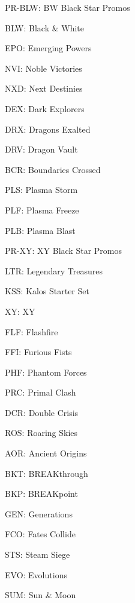 \documentclass[12pt,twocolumn]{article}
\begin{document}
PR-BLW: BW Black Star Promos

BLW: Black \& White

EPO: Emerging Powers

NVI: Noble Victories

NXD: Next Destinies

DEX: Dark Explorers

DRX: Dragons Exalted

DRV: Dragon Vault

BCR: Boundaries Crossed

PLS: Plasma Storm

PLF: Plasma Freeze

PLB: Plasma Blast

PR-XY: XY Black Star Promos

LTR: Legendary Treasures

KSS: Kalos Starter Set

XY: XY

FLF: Flashfire

FFI: Furious Fists

PHF: Phantom Forces

PRC: Primal Clash

DCR: Double Crisis

ROS: Roaring Skies

AOR: Ancient Origins

BKT: BREAKthrough

BKP: BREAKpoint

GEN: Generations

FCO: Fates Collide

STS: Steam Siege

EVO: Evolutions

SUM: Sun \& Moon
\end{document}
